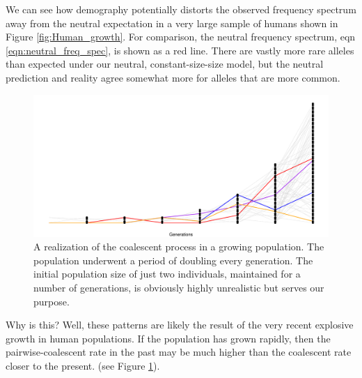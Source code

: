 We can see how demography potentially distorts the observed frequency spectrum away from the neutral expectation in a very large sample of humans shown in Figure \ref{fig:Human_growth}. For
comparison, the neutral frequency spectrum, eqn
\eqref{eqn:neutral_freq_spec}, is shown as a red line. There are
  vastly more rare alleles than expected under our neutral, constant-size-size model, but the neutral prediction and reality agree somewhat more for alleles that are more common.

\begin{figure}
\begin{center}
  \includegraphics[width = \textwidth]{figures/Genetic_drift/Demography/Growth_genealogy.pdf}
\end{center}
\caption{A realization of the coalescent process in a growing population. The population underwent a period of doubling every generation. The initial population size of just two individuals, maintained for a number of generations, is obviously highly unrealistic but serves our purpose.   } \label{fig:Genealogy_growth}
\end{figure}

Why is this? Well, these patterns are likely the result of the very recent
explosive growth in human populations. If the population has grown rapidly, then the pairwise-coalescent rate in the past may be much higher than the coalescent rate closer to the present. (see Figure \ref{fig:Genealogy_growth}).

